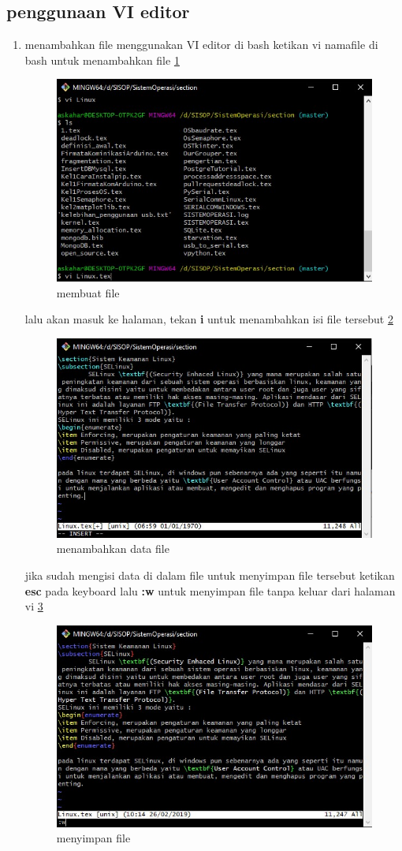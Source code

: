  \subsection{penggunaan VI editor}
\begin{enumerate}
\item menambahkan file menggunakan VI editor di bash
\subitem ketikan vi namafile di bash untuk menambahkan file \ref{vi1}
\begin{figure}[!htbp]
\centerline{\includegraphics[width=.75\textwidth]{Figures/vi1.jpg}}
\caption{membuat file}
\label{vi1}
\end{figure}

\subitem lalu akan masuk ke halaman, tekan \textbf{i} untuk menambahkan isi file tersebut \ref{vi2}
\begin{figure}[!htbp]
\centerline{\includegraphics[width=.75\textwidth]{Figures/vi3.jpg}}
\caption{menambahkan data file}
\label{vi2}
\end{figure}

\subitem jika sudah mengisi data di dalam file untuk menyimpan file tersebut ketikan \textbf{esc} pada keyboard lalu \textbf{:w} untuk menyimpan file tanpa keluar dari halaman vi \ref{viw}
\begin{figure}[!htbp]
\centerline{\includegraphics[width=.75\textwidth]{Figures/vi(w).jpg}}
\caption{menyimpan file}
\label{viw}
\end{figure}


\end{enumerate}
